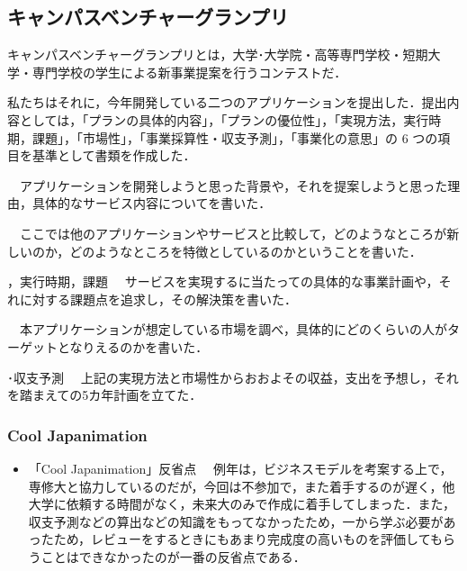 \subsection{キャンパスベンチャーグランプリ}
\par
キャンパスベンチャーグランプリとは，大学･大学院・高等専門学校・短期大学・専門学校の学生による新事業提案を行うコンテストだ．
\par
私たちはそれに，今年開発している二つのアプリケーションを提出した．提出内容としては，「プランの具体的内容」，「プランの優位性」，「実現方法，実行時期，課題」，「市場性」，「事業採算性・収支予測」，「事業化の意思」の 6 つの項目を基準として書類を作成した．
\par
\begin{enumerate}
　アプリケーションを開発しようと思った背景や，それを提案しようと思った理由，具体的なサービス内容についてを書いた．
\par
{}
　ここでは他のアプリケーションやサービスと比較して，どのようなところが新しいのか，どのようなところを特徴としているのかということを書いた．
\par
{}，実行時期，課題
　サービスを実現するに当たっての具体的な事業計画や，それに対する課題点を追求し，その解決策を書いた．
\par
{}
　本アプリケーションが想定している市場を調べ，具体的にどのくらいの人がターゲットとなりえるのかを書いた．
\par
{}･収支予測
　上記の実現方法と市場性からおおよその収益，支出を予想し，それを踏まえての5カ年計画を立てた．
\end{enumerate}
\par
\subsubsection{Cool Japanimation}
\par
\begin{itemize}
　9月26日から10月31日の期間で提出するための書類作成を行なった．今回は未来大のみで書類作成を行なった．アプリケーションでどのような利益を得るか，またそのモデルからどれくらいの規模の利益を得られるか，アプリケーションを企業として運営した場合の人件費などについて考えた．収支予測を考えるに至って，未来大では知識不足だったので，作成に大いに手間取ってしまった．また，一次審査を通過することはなかった．
\par
\item「Cool Japanimation」反省点
　例年は，ビジネスモデルを考案する上で，専修大と協力しているのだが，今回は不参加で，また着手するのが遅く，他大学に依頼する時間がなく，未来大のみで作成に着手してしまった．また，収支予測などの算出などの知識をもってなかったため，一から学ぶ必要があったため，レビューをするときにもあまり完成度の高いものを評価してもらうことはできなかったのが一番の反省点である．
\end{itemize}
